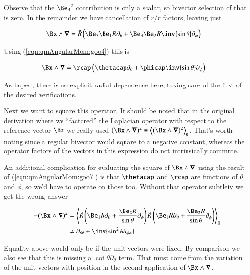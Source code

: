 Observe that the ${\Be_3}^2$ contribution is only a scalar, so bivector selection of that is zero.  In the remainder we have cancellation of $r/r$ factors, leaving just

\begin{align}\label{eqn:qmAngularMom:goo6}
\Bx \wedge \spacegrad 
&=
\tilde{R} \left( \Be_3 \Be_1 R \partial_\theta + \Be_3 \Be_2 R \inv{\sin\theta} \partial_\phi \right) 
\end{align}

Using (\ref{eqn:qmAngularMom:goo4}) this is

\begin{align}\label{eqn:qmAngularMom:goo7}
\Bx \wedge \spacegrad 
&=
\rcap \left( \thetacap \partial_\theta + \phicap \inv{\sin\theta} \partial_\phi \right) 
\end{align}

As hoped, there is no explicit radial dependence here, taking care of the first of the desired verifications.

Next we want to square this operator.  It should be noted that in the original derivation where we ``factored'' the Laplacian operator with respect to the reference vector $\Bx$ we really used $(\Bx \wedge \spacegrad)^2 \equiv \gpgradezero{(\Bx \wedge \spacegrad)^2}$.  That's worth noting since a regular bivector would square to a negative constant, whereas the operator factors of the vectors in this expression do not intrinsically commute.

An additional complication for evaluating the square of $\Bx \wedge \spacegrad$ using the result of (\ref{eqn:qmAngularMom:goo7}) is that $\thetacap$ and $\rcap$ are functions of $\theta$ and $\phi$, so we'd have to operate on those too.  Without that operator subtlety we get the wrong answer

\begin{align*}
-(\Bx \wedge \spacegrad)^2
&=
\gpgradezero{ 
\tilde{R} \left( \Be_1 R \partial_\theta + \frac{\Be_2 R}{\sin\theta}\partial_\phi \right)
\tilde{R} \left( \Be_1 R \partial_\theta + \frac{\Be_2 R}{\sin\theta}\partial_\phi \right)
 } \\
&\ne
\partial_{\theta\theta} + \inv{\sin^2\theta \partial_{\phi\phi}}
\end{align*}

Equality above would only be if the unit vectors were fixed.  By comparison we also see that this is missing a $\cot\theta \partial_\theta$ term.  That must come from the variation of the unit vectors with position in the second application of $\Bx \wedge \spacegrad$.

\EndArticle
